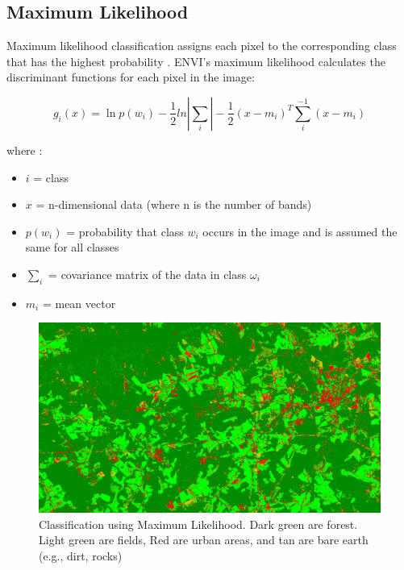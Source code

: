 \documentclass{sigkddExp}
\begin{document}
\subsection{Maximum Likelihood}

Maximum likelihood classification assigns each pixel to the corresponding class that has the highest probability \cite{envi_ml}.
ENVI's maximum likelihood calculates the discriminant functions for each pixel in the image:

\begin{equation}
g_i(x) = \ln p(w_i) - \frac{1}{2} ln \left|\sum_i\right| - \frac{1}{2}(x - m_i)^T \sum_i^{-1}(x - m_i)
\end{equation}

where \cite{envi_ml}:

\begin{itemize}
\item $i$ = class
\item $x$ = n-dimensional data (where n is the number of bands)
\item $p(w_i)$ = probability that class $w_i$ occurs in the image and is assumed the same for all classes
\item $\sum_i$ = covariance matrix of the data in class $ω_i$
\item $m_i$ = mean vector
\end{itemize}

\begin{figure}[ht!]
  \includegraphics[width=\linewidth]{floyd_ML.jpg}
  \caption{Classification using Maximum Likelihood.
  Dark green are forest. Light green are fields, Red are urban areas, and tan are bare earth (e.g., dirt, rocks)}
  \label{fig:ml}
\end{figure}
\end{document}
